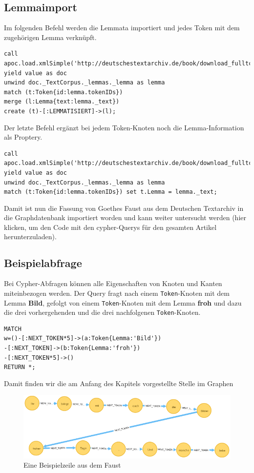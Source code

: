 \documentclass[ngerman,]{scrreprt}
\begin{document}
\subsection{Lemmaimport}\label{lemmaimport}

Im folgenden Befehl werden die Lemmata importiert und jedes Token mit dem zugehörigen Lemma verknüpft.

\begin{verbatim}
call apoc.load.xmlSimple('http://deutschestextarchiv.de/book/download_fulltcf/16181') yield value as doc
unwind doc._TextCorpus._lemmas._lemma as lemma
match (t:Token{id:lemma.tokenIDs})
merge (l:Lemma{text:lemma._text})
create (t)-[:LEMMATISIERT]->(l);
\end{verbatim}

Der letzte Befehl ergänzt bei jedem Token-Knoten noch die Lemma-Information als Proptery.

\begin{verbatim}
call apoc.load.xmlSimple('http://deutschestextarchiv.de/book/download_fulltcf/16181') yield value as doc
unwind doc._TextCorpus._lemmas._lemma as lemma
match (t:Token{id:lemma.tokenIDs}) set t.Lemma = lemma._text;
\end{verbatim}

Damit ist nun die Fassung von Goethes Faust aus dem Deutschen Textarchiv in die Graphdatenbank importiert worden und kann weiter untersucht werden (hier klicken, um den Code mit den cypher-Querys für den gesamten Artikel herunterzuladen).

\subsection{Beispielabfrage}\label{beispielabfrage}

Bei Cypher-Abfragen können alle Eigenschaften von Knoten und Kanten miteinbezogen werden. Der Query fragt nach einem \texttt{Token}-Knoten mit dem Lemma \textbf{Bild}, gefolgt von einem \texttt{Token}-Knoten mit dem Lemma \textbf{froh} und dazu die drei vorhergehenden und die drei nachfolgenen \texttt{Token}-Knoten.

\begin{verbatim}
MATCH
w=()-[:NEXT_TOKEN*5]->(a:Token{Lemma:'Bild'})
-[:NEXT_TOKEN]->(b:Token{Lemma:'froh'})
-[:NEXT_TOKEN*5]->()
RETURN *;
\end{verbatim}

Damit finden wir die am Anfang des Kapitels vorgestellte Stelle im Graphen

\begin{figure}
\centering
\includegraphics{Bilder/TEI2Graph/BilderFroherTage.png}
\caption{Eine Beispielzeile aus dem Faust}
\end{figure}
\end{document}
